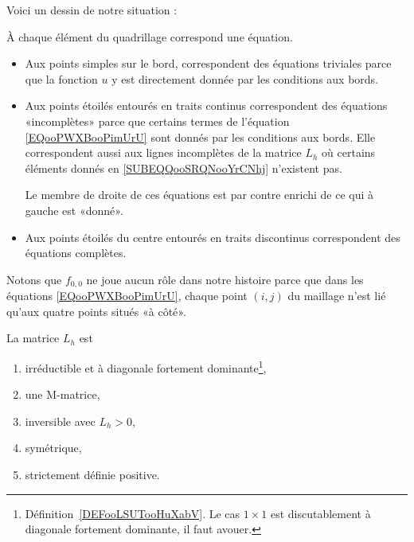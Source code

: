 Voici un dessin de notre situation :

\begin{center}
	
\end{center}

À chaque élément du quadrillage correspond une équation.
\begin{itemize}
	\item
	      Aux points simples sur le bord, correspondent des équations triviales parce que la fonction \(u \) y est directement donnée par les conditions aux bords.
	\item
	      Aux points étoilés entourés en traits continus correspondent des équations «incomplètes» parce que certains termes de l'équation \eqref{EQooPWXBooPimUrU} sont donnés par les conditions aux bords. Elle correspondent aussi aux lignes incomplètes de la matrice \( L_h\) où certains éléments donnés en \eqref{SUBEQQooSRQNooYrCNhj} n'existent pas.

	      Le membre de droite de ces équations est par contre enrichi de ce qui à gauche est «donné».
	\item
	      Aux points étoilés du centre entourés en traits discontinus correspondent des équations complètes.
\end{itemize}

Notons que \( f_{0,0}\) ne joue aucun rôle dans notre histoire parce que dans les équations \eqref{EQooPWXBooPimUrU}, chaque point \( (i,j)\) du maillage n'est lié qu'aux quatre points situés «à côté».

\begin{proposition} \label{PROPooWGTRooVjWhYY}
	La matrice \(L_h\) est
	\begin{enumerate}
		\item
		      irréductible et à diagonale fortement dominante\footnote{Définition~\ref{DEFooLSUTooHuXabV}. Le cas \( 1\times 1\) est discutablement à diagonale fortement dominante, il faut avouer.},
		\item       \label{ITEMooOOHPooDsvUPP}
		      une M-matrice,
		\item
		      inversible avec \( L_{h}>0\),
		\item
		      symétrique,
		\item
		      strictement définie positive.
	\end{enumerate}
\end{proposition}

